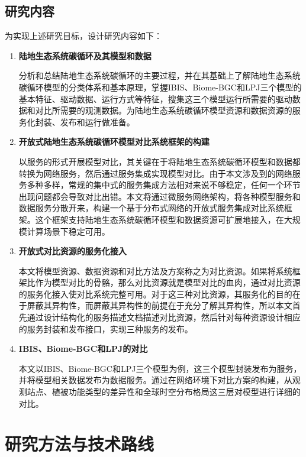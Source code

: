 \subsection{研究内容}
为实现上述研究目标，设计研究内容如下：
\begin{enumerate}[(1)]
\item \textbf{陆地生态系统碳循环及其模型和数据}

分析和总结陆地生态系统碳循环的主要过程，并在其基础上了解陆地生态系统碳循环模型的分类体系和基本原理，掌握IBIS、Biome-BGC和LPJ三个模型的基本特征、驱动数据、运行方式等特征，搜集这三个模型运行所需要的驱动数据和对比所需要的观测数据。为陆地生态系统碳循环模型资源和数据资源的服务化封装、发布和运行做准备。

\item \textbf{开放式陆地生态系统碳循环模型对比系统框架的构建}

以服务的形式开展模型对比，其关键在于将陆地生态系统碳循环模型和数据都转换为网络服务，然后通过服务集成实现模型对比。由于本文涉及到的网络服务多种多样，常规的集中式的服务集成方法相对来说不够稳定，任何一个环节出现问题都会导致对比出错。本文将通过微服务网络架构，将各种模型服务和数据服务分散开来，构建一个基于分布式网络的开放式服务集成对比系统框架。这个框架支持陆地生态系统碳循环模型和数据资源可扩展地接入，在大规模计算场景下稳定可用。

\item \textbf{开放式对比资源的服务化接入}

本文将模型资源、数据资源和对比方法及方案称之为对比资源。如果将系统框架比作为模型对比的骨骼，那么对比资源就是模型对比的血肉，通过对比资源的服务化接入使对比系统完整可用。对于这三种对比资源，其服务化的目的在于屏蔽其异构性，而屏蔽其异构性的前提在于充分了解其异构性，所以本文首先通过设计结构化的服务描述文档描述对比资源，然后针对每种资源设计相应的服务封装和发布接口，实现三种服务的发布。

\item \textbf{IBIS、Biome-BGC和LPJ的对比}

本文以IBIS、Biome-BGC和LPJ三个模型为例，这三个模型封装发布为服务，并将模型相关数据发布为数据服务。通过在网络环境下对比方案的构建，从观测站点、植被功能类型的差异性和全球时空分布格局这三层对模型进行详细的对比。
\end{enumerate}


\section{研究方法与技术路线}
